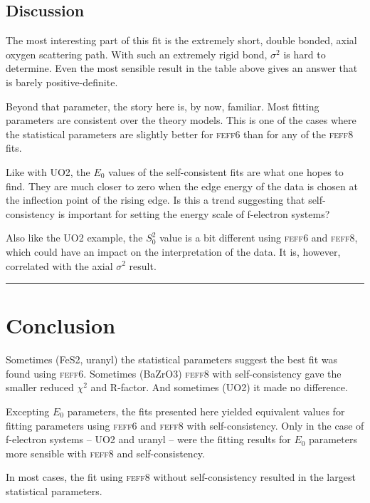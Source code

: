 \documentclass[11pt]{article}
\begin{document}
\subsection{Discussion}
\label{sec:orgheadline42}

The most interesting part of this fit is the extremely short, double
bonded, axial oxygen scattering path. With such an extremely rigid bond,
$\sigma^2$ is hard to determine. Even the most sensible result in the table
above gives an answer that is barely positive-definite.

Beyond that parameter, the story here is, by now, familiar. Most fitting
parameters are consistent over the theory models. This is one of the
cases where the statistical parameters are slightly better for \textsc{feff6}
than for any of the \textsc{feff8} fits.

Like with UO2, the $E_0$ values of the self-consistent fits are what one
hopes to find. They are much closer to zero when the edge energy of the
data is chosen at the inflection point of the rising edge. Is this a
trend suggesting that self-consistency is important for setting the
energy scale of f-electron systems?

Also like the UO2 example, the $S_0^2$ value is a bit different using
\textsc{feff6} and \textsc{feff8}, which could have an impact on the interpretation of
the data. It is, however, correlated with the axial $\sigma^2$ result.

\rule{\linewidth}{0.5pt}

\section{Conclusion}
\label{sec:orgheadline47}

Sometimes (FeS2, uranyl) the statistical parameters suggest the best
fit was found using \textsc{feff6}. Sometimes (BaZrO3) \textsc{feff8}
with self-consistency gave the smaller reduced $\chi^2$ and
R-factor. And sometimes (UO2) it made no difference.

Excepting $E_0$ parameters, the fits presented here yielded equivalent
values for fitting parameters using \textsc{feff6} and \textsc{feff8}
with self-consistency. Only in the case of f-electron systems -- UO2
and uranyl -- were the fitting results for $E_0$ parameters more sensible
with \textsc{feff8} and self-consistency.

In most cases, the fit using \textsc{feff8} without self-consistency
resulted in the largest statistical parameters.
\end{document}
